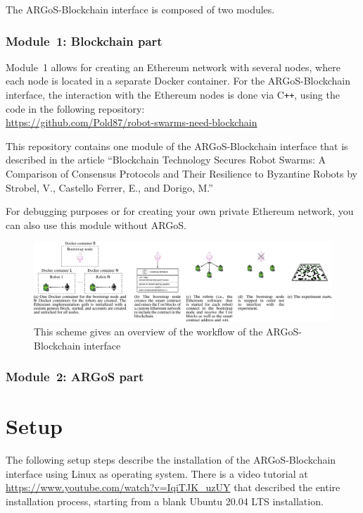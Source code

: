 \documentclass{article}
\begin{document}
The ARGoS-Blockchain interface is composed of two modules. 

\subsubsection{Module~1: Blockchain part}
Module~1 allows for creating an Ethereum network with several nodes,
where each node is located in a separate Docker container. For the
ARGoS-Blockchain interface, the interaction with the Ethereum nodes is
done via C\texttt{++}, using the code in the following repository:\\
\url{https://github.com/Pold87/robot-swarms-need-blockchain}

This repository contains one module of the ARGoS-Blockchain interface
that is described in the article ``Blockchain Technology Secures Robot
Swarms: A Comparison of Consensus Protocols and Their Resilience to
Byzantine Robots by Strobel, V., Castello Ferrer, E., and Dorigo, M.''

For debugging purposes or for creating your own private Ethereum
network, you can also use this module without ARGoS.

\begin{figure}[t]
  \centering
  \includegraphics[width=\textwidth]{interface}
  \caption[Overview of the ARGoS-Blockchain interface]{This scheme
    gives an overview of the workflow of the ARGoS-Blockchain
    interface}
  \label{fig:interface}
\end{figure}

\subsubsection{Module~2: ARGoS part}

\section{Setup}

The following setup steps describe the installation of the
ARGoS-Blockchain interface using Linux as operating system. There is a
video tutorial at \url{https://www.youtube.com/watch?v=IqiTJK_uzUY}
that described the entire installation process, starting from a blank
Ubuntu 20.04 LTS installation.
\end{document}
